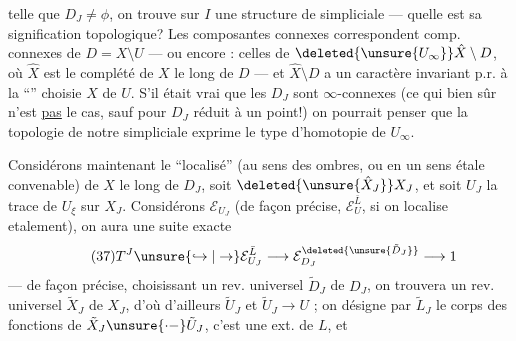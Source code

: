 

telle que $D_J\ne\phi$,  on trouve sur $I$ une structure de   \unsure{,} simpliciale --- quelle est sa signification topologique? Les composantes connexes correspondent comp. connexes de $D=X\setminus U$ --- ou encore : celles de $\deleted{\unsure{U_\infty}}\hat X\setminus D$, où $\hat X$ est le  complété de $X$ le long de $D$ --- et $\hat X\setminus D$ a un caractère invariant p.r. à la ``'' choisie $X$ de $U$. S'il était vrai que les $D_J$  sont $\infty$-connexes (ce qui bien sûr n'est \uline{pas} le cas, sauf pour $D_J$ réduit à un point!) on pourrait penser que la topologie de notre   simpliciale exprime le type d'homotopie de $U_\infty$.

Considérons maintenant le ``localisé''  (au sens des ombres, ou en un sens étale convenable) de $X$ le long de $D_J$, soit $\deleted{\unsure{\hat X_J}}X_J$, et soit $U_J$  la trace de $U_\xi$ sur $X_J$. Considérons $\mathcal E_{U_J}$ (de façon précise, $\mathcal E_U^{\bar L}$, si on localise  etalement), on aura une suite exacte
\[
\tag{37}
T^J\unsure{\hookrightarrow|\to}\mathcal E_{U_J}^{\bar L}\longrightarrow\mathcal E_{D_J}^{\deleted{\unsure{\tilde D_J}}}\longrightarrow1
\]
--- de façon précise, choisissant un rev. universel $\tilde D_J$ de $D_J$, on trouvera un rev. universel  $\tilde X_J$ de $X_J$, d'où d'ailleurs $\tilde U_J$ et $\tilde U_J\longrightarrow U$ ;  on désigne par $\tilde L_J$ le corps des fonctions de $\tilde X_J\unsure{\mathrel{\cdot-}}\tilde U_J$, c'est une ext.  de $L$, et




